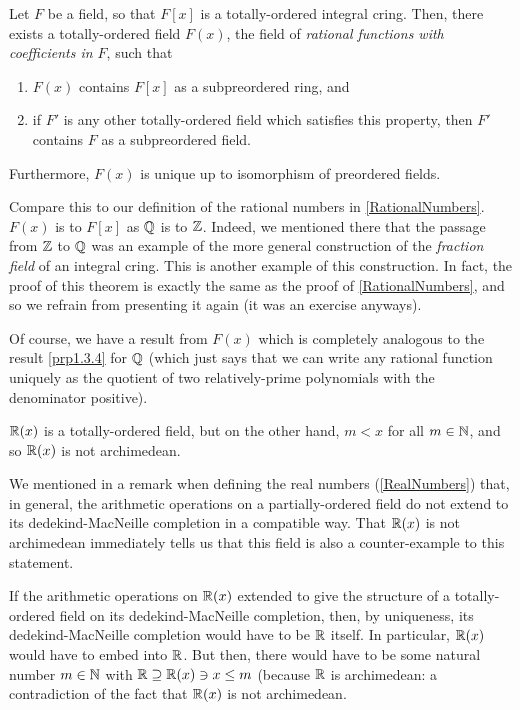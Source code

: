 \begin{thm}
Let $F$ be a field, so that $F[x]$ is a totally-ordered integral cring.  Then, there exists a totally-ordered field $F(x)$, the field of \emph{rational functions with coefficients in $F$}, such that
\begin{enumerate}
\item $F(x)$ contains $F[x]$ as a subpreordered ring, and
\item if $F'$ is any other totally-ordered field which satisfies this property, then $F'$ contains $F$ as a subpreordered field.
\end{enumerate}
Furthermore, $F(x)$ is unique up to isomorphism of preordered fields.
\begin{rmk}
Compare this to our definition of the rational numbers in \cref{RationalNumbers}.  $F(x)$ is to $F[x]$ as $\mathbb{Q}$ is to $\mathbb{Z}$.  Indeed, we mentioned there that the passage from $\mathbb{Z}$ to $\mathbb{Q}$ was an example of the more general construction of the \emph{fraction field} of an integral cring.  This is another example of this construction.  In fact, the proof of this theorem is exactly the same as the proof of \cref{RationalNumbers}, and so we refrain from presenting it again (it was an exercise anyways).
\end{rmk}
\end{thm}
Of course, we have a result from $F(x)$ which is completely analogous to the result \cref{prp1.3.4} for $\mathbb{Q}$ (which just says that we can write any rational function uniquely as the quotient of two relatively-prime polynomials with the denominator positive).
\begin{exm}\label{exm2.3.12}
$\mathbb{R} (x)$ is a totally-ordered field, but on the other hand, $m<x$ for all $m\in \mathbb{N}$, and so $\mathbb{R} (x)$ is not archimedean.
\end{exm}
We mentioned in a remark when defining the real numbers (\cref{RealNumbers}) that, in general, the arithmetic operations on a partially-ordered field do not extend to its dedekind-MacNeille completion in a compatible way.  That $\mathbb{R} (x)$ is not archimedean immediately tells us that this field is also a counter-example to this statement.
\begin{exm}\label{exm3.2.13}
If the arithmetic operations on $\mathbb{R} (x)$ extended to give the structure of a totally-ordered field on its dedekind-MacNeille completion, then, by uniqueness, its dedekind-MacNeille completion would have to be $\mathbb{R}$ itself.  In particular, $\mathbb{R} (x)$ would have to embed into $\mathbb{R}$.  But then, there would have to be some natural number $m\in \mathbb{N}$ with $\mathbb{R} \supseteq \mathbb{R} (x)\ni x\leq m$ (because $\mathbb{R}$ is archimedean:  a contradiction of the fact that $\mathbb{R} (x)$ is not archimedean.
\end{exm}

